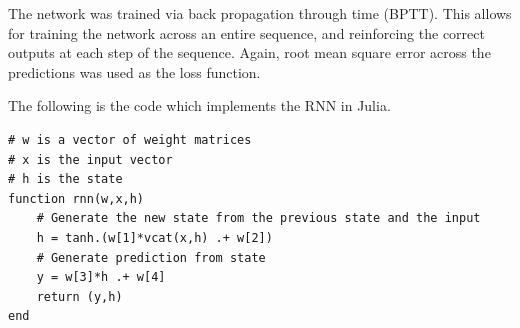 The network was trained via back propagation through time (BPTT)\cite{WERBOS1988339}.
This allows for training the network across an entire sequence, and reinforcing the correct outputs at each step of the sequence.
Again, root mean square error across the predictions was used as the loss function.

The following is the code which implements the RNN in Julia.

\begin{lstlisting}
# w is a vector of weight matrices
# x is the input vector
# h is the state
function rnn(w,x,h)
    # Generate the new state from the previous state and the input
    h = tanh.(w[1]*vcat(x,h) .+ w[2])
    # Generate prediction from state
    y = w[3]*h .+ w[4]
    return (y,h)
end
\end{lstlisting}
